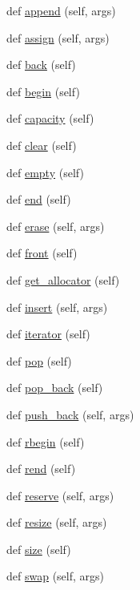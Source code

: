 \begin{DoxyCompactItemize}
\item 
def \hyperlink{classstructural_1_1_string_vector_a91f4106850df6b9d1466a8854987782d}{append} (self, args)
\item 
def \hyperlink{classstructural_1_1_string_vector_a742d6b677276f2608c003c55732b84bb}{assign} (self, args)
\item 
def \hyperlink{classstructural_1_1_string_vector_a2b7c542e3dc04abd19b7cd4d886dc038}{back} (self)
\item 
def \hyperlink{classstructural_1_1_string_vector_ae6103ccd39549b36b1aed3e083780fa4}{begin} (self)
\item 
def \hyperlink{classstructural_1_1_string_vector_a224ebca4f28aa852ad56e241e2fa85e6}{capacity} (self)
\item 
def \hyperlink{classstructural_1_1_string_vector_a84664c344b092eb5da703d834c2da2dd}{clear} (self)
\item 
def \hyperlink{classstructural_1_1_string_vector_acfe91f0fd4b104fe260662260245cc6f}{empty} (self)
\item 
def \hyperlink{classstructural_1_1_string_vector_a6f0916ba7dbf32eeb0545c2202c88185}{end} (self)
\item 
def \hyperlink{classstructural_1_1_string_vector_a5dc2085dcdaaec053d1f3509348df5cd}{erase} (self, args)
\item 
def \hyperlink{classstructural_1_1_string_vector_a852dbda6e102314d79e7ba0b6077fff5}{front} (self)
\item 
def \hyperlink{classstructural_1_1_string_vector_a849045fabb7612f5c552855b4f2c296c}{get\+\_\+allocator} (self)
\item 
def \hyperlink{classstructural_1_1_string_vector_a4ae295c50b255365080ac16b90862c31}{insert} (self, args)
\item 
def \hyperlink{classstructural_1_1_string_vector_a48198753ef094848fea7444c12076bfb}{iterator} (self)
\item 
def \hyperlink{classstructural_1_1_string_vector_a3bdda467456e06060a7dd263f913a971}{pop} (self)
\item 
def \hyperlink{classstructural_1_1_string_vector_ae939197b68f0d6cacba37d19be49ae39}{pop\+\_\+back} (self)
\item 
def \hyperlink{classstructural_1_1_string_vector_a53703ff46f2368738618969149a1595d}{push\+\_\+back} (self, args)
\item 
def \hyperlink{classstructural_1_1_string_vector_af9e3e8bbdb9ed8b94263518d2a4a3969}{rbegin} (self)
\item 
def \hyperlink{classstructural_1_1_string_vector_acd25cebbbd0ade24cfc0f4099641780c}{rend} (self)
\item 
def \hyperlink{classstructural_1_1_string_vector_a1109b5e8f000369ae12ef7642dfbe9ff}{reserve} (self, args)
\item 
def \hyperlink{classstructural_1_1_string_vector_aa7be17797cb1fb8b77ee0ef721890efe}{resize} (self, args)
\item 
def \hyperlink{classstructural_1_1_string_vector_ae3042135261e0312b4f78246a3f81b7e}{size} (self)
\item 
def \hyperlink{classstructural_1_1_string_vector_a3f83604b5610c15065d5a3bccc07c95c}{swap} (self, args)
\end{DoxyCompactItemize}
